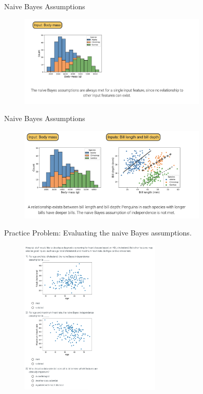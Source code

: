 \documentclass[10pt,dvipsnames]{beamer}
\begin{document}
\begin{frame}{Naive Bayes Assumptions}
	\begin{figure}[ht]
		\centering
		\includegraphics[width=0.8\textwidth]{imgs/nb_16.png}
	\end{figure}
\end{frame}

\begin{frame}{Naive Bayes Assumptions}
	\begin{figure}[ht]
		\centering
		\includegraphics[width=0.8\textwidth]{imgs/nb_17.png}
	\end{figure}
\end{frame}

\begin{frame}{Practice Problem: Evaluating the naive Bayes assumptions.}
	\begin{figure}[ht]
		\centering
		\includegraphics[width=0.6\textwidth]{imgs/nb_18.png}
	\end{figure}
\end{frame}
\end{document}
